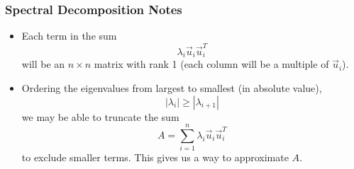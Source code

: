 \begin{frame}\frametitle{Spectral Decomposition Notes}

\begin{itemize}
    \item<1-> Each term in the sum $$\lambda_i\vec u_i \vec u_i^T$$ will be an $n \times n$ matrix with rank 1 (each column will be a multiple of $\vec u_i$). 
    \item<2-> Ordering the eigenvalues from largest to smallest (in absolute value),
    $$|\lambda_i | \ge |\lambda_{i+1}|$$
    we may be able to truncate the sum 
    $$A = \sum_{i=1}^{n} \lambda_i \vec u_i \vec u_i^T$$
    to exclude smaller terms. This gives us a way to approximate $A$. 

\end{itemize}
\end{frame}





